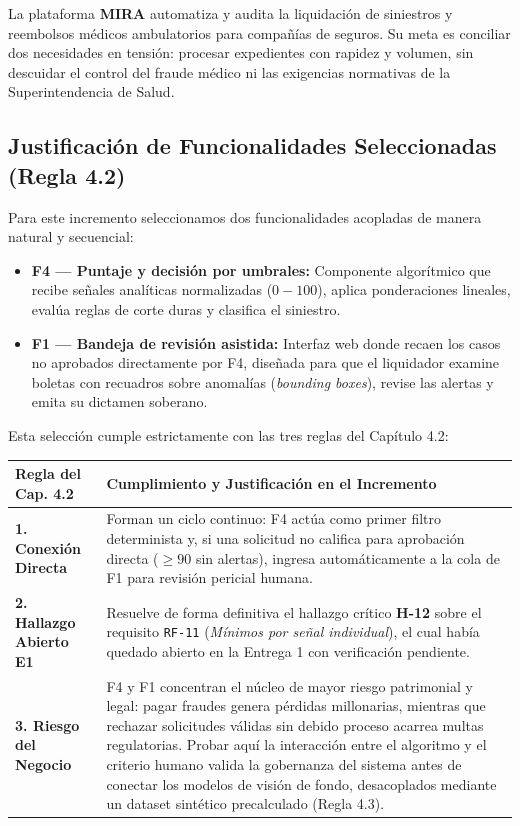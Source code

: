 \documentclass[11pt,letterpaper]{article}
\begin{document}
La plataforma \textbf{MIRA} automatiza y audita la liquidación de siniestros y reembolsos médicos ambulatorios para compañías de seguros. Su meta es conciliar dos necesidades en tensión: procesar expedientes con rapidez y volumen, sin descuidar el control del fraude médico ni las exigencias normativas de la Superintendencia de Salud.

\subsection{Justificación de Funcionalidades Seleccionadas (Regla 4.2)}
Para este incremento seleccionamos dos funcionalidades acopladas de manera natural y secuencial:
\begin{itemize}
    \item \textbf{F4 — Puntaje y decisión por umbrales:} Componente algorítmico que recibe señales analíticas normalizadas ($0-100$), aplica ponderaciones lineales, evalúa reglas de corte duras y clasifica el siniestro.
    \item \textbf{F1 — Bandeja de revisión asistida:} Interfaz web donde recaen los casos no aprobados directamente por F4, diseñada para que el liquidador examine boletas con recuadros sobre anomalías (\textit{bounding boxes}), revise las alertas y emita su dictamen soberano.
\end{itemize}

Esta selección cumple estrictamente con las tres reglas del Capítulo 4.2:
\begin{table}[h]
\centering
\small
\begin{tabularx}{\textwidth}{P{3.2cm}Y}
\toprule
\textbf{Regla del Cap. 4.2} & \textbf{Cumplimiento y Justificación en el Incremento}\\
\midrule
\textbf{1. Conexión Directa} & Forman un ciclo continuo: F4 actúa como primer filtro determinista y, si una solicitud no califica para aprobación directa ($\ge 90$ sin alertas), ingresa automáticamente a la cola de F1 para revisión pericial humana.\\
\textbf{2. Hallazgo Abierto E1} & Resuelve de forma definitiva el hallazgo crítico \textbf{H-12} sobre el requisito \texttt{RF-11} (\textit{Mínimos por señal individual}), el cual había quedado abierto en la Entrega 1 con verificación pendiente.\\
\textbf{3. Riesgo del Negocio} & F4 y F1 concentran el núcleo de mayor riesgo patrimonial y legal: pagar fraudes genera pérdidas millonarias, mientras que rechazar solicitudes válidas sin debido proceso acarrea multas regulatorias. Probar aquí la interacción entre el algoritmo y el criterio humano valida la gobernanza del sistema antes de conectar los modelos de visión de fondo, desacoplados mediante un dataset sintético precalculado (Regla 4.3).\\
\bottomrule
\end{tabularx}
\end{table}
\end{document}
